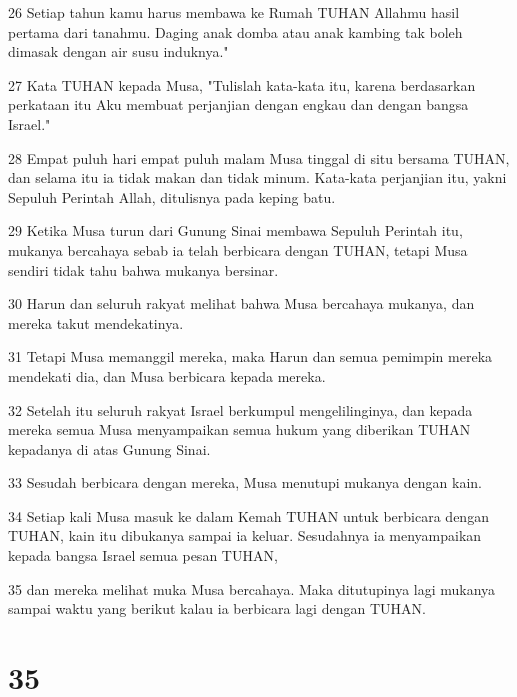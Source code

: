 \par 26 Setiap tahun kamu harus membawa ke Rumah TUHAN Allahmu hasil pertama dari tanahmu. Daging anak domba atau anak kambing tak boleh dimasak dengan air susu induknya."
\par 27 Kata TUHAN kepada Musa, "Tulislah kata-kata itu, karena berdasarkan perkataan itu Aku membuat perjanjian dengan engkau dan dengan bangsa Israel."
\par 28 Empat puluh hari empat puluh malam Musa tinggal di situ bersama TUHAN, dan selama itu ia tidak makan dan tidak minum. Kata-kata perjanjian itu, yakni Sepuluh Perintah Allah, ditulisnya pada keping batu.
\par 29 Ketika Musa turun dari Gunung Sinai membawa Sepuluh Perintah itu, mukanya bercahaya sebab ia telah berbicara dengan TUHAN, tetapi Musa sendiri tidak tahu bahwa mukanya bersinar.
\par 30 Harun dan seluruh rakyat melihat bahwa Musa bercahaya mukanya, dan mereka takut mendekatinya.
\par 31 Tetapi Musa memanggil mereka, maka Harun dan semua pemimpin mereka mendekati dia, dan Musa berbicara kepada mereka.
\par 32 Setelah itu seluruh rakyat Israel berkumpul mengelilinginya, dan kepada mereka semua Musa menyampaikan semua hukum yang diberikan TUHAN kepadanya di atas Gunung Sinai.
\par 33 Sesudah berbicara dengan mereka, Musa menutupi mukanya dengan kain.
\par 34 Setiap kali Musa masuk ke dalam Kemah TUHAN untuk berbicara dengan TUHAN, kain itu dibukanya sampai ia keluar. Sesudahnya ia menyampaikan kepada bangsa Israel semua pesan TUHAN,
\par 35 dan mereka melihat muka Musa bercahaya. Maka ditutupinya lagi mukanya sampai waktu yang berikut kalau ia berbicara lagi dengan TUHAN.

\chapter{35}

